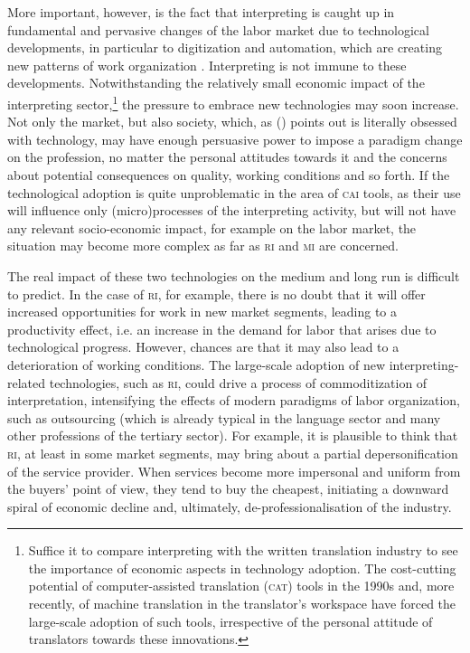 \documentclass[output=paper]{langsci/langscibook}
\begin{document}
More important, however, is the fact that interpreting is caught up in fundamental and pervasive changes of the labor market due to technological developments, in particular to digitization and automation, which are creating new patterns of work organization \citep{ursula_huws_logged_2016,neufeind_work_2018}. Interpreting is not immune to these developments. Notwithstanding the relatively small economic impact of the interpreting sector,\footnote{Suffice it to compare interpreting with the written translation industry to see the importance of economic aspects in technology adoption. The cost-cutting potential of computer-assisted translation (\textsc{cat}) tools in the 1990s and, more recently, of machine translation in the translator’s workspace have forced the large-scale adoption of such tools, irrespective of the personal attitude of translators towards these innovations.} the pressure to embrace new technologies may soon increase. Not only the market, but also society, which, as \citeauthor{besnier_homme_2012} (\citeyear{besnier_homme_2012}) points out is literally obsessed with technology, may have enough persuasive power to impose a paradigm change on the profession, no matter the personal attitudes towards it and the concerns about potential consequences on quality, working conditions and so forth. If the technological adoption is quite unproblematic in the area of \textsc{cai} tools, as their use will influence only (micro)processes of the interpreting activity, but will not have any relevant socio-economic impact, for example on the labor market, the situation may become more complex as far as \textsc{ri} and \textsc{mi} are concerned. 

The real impact of these two technologies on the medium and long run is difficult to predict. In the case of \textsc{ri}, for example, there is no doubt that it will offer increased opportunities for work in new market segments, leading to a productivity effect, i.e. an increase in the demand for labor that arises due to technological progress. However, chances are that it may also lead to a deterioration of working conditions. The large-scale adoption of new interpreting-related technologies, such as \textsc{ri}, could drive a process of commoditization of interpretation, intensifying the effects of modern paradigms of labor organization, such as outsourcing (which is already typical in the language sector and many other professions of the tertiary sector). For example, it is plausible to think that \textsc{ri}, at least in some market segments, may bring about a partial depersonification of the service provider. When services become more impersonal and uniform from the buyers’ point of view, they tend to buy the cheapest, initiating a downward spiral of economic decline and, ultimately, de-professionalisation of the industry. 
 
\end{document}
